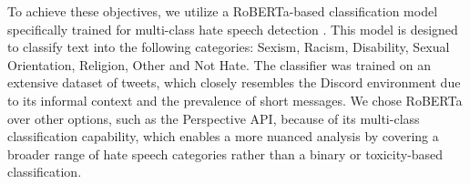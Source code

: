 To achieve these objectives, we utilize a RoBERTa-based classification model specifically trained for multi-class hate speech detection \cite{antypas2023robust}. This model is designed to classify text into the following categories: Sexism, Racism, Disability, Sexual Orientation, Religion, Other and Not Hate. The classifier was trained on an extensive dataset of tweets, which closely resembles the Discord environment due to its informal context and the prevalence of short messages. We chose RoBERTa over other options, such as the Perspective API, because of its multi-class classification capability, which enables a more nuanced analysis by covering a broader range of hate speech categories rather than a binary or toxicity-based classification.
